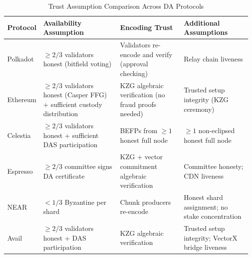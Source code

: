\begin{table}[t]
\centering
\caption{Trust Assumption Comparison Across DA Protocols}
\label{tab:trust_summary}
\setlength{\tabcolsep}{4pt}
\renewcommand{\arraystretch}{1.2}
\footnotesize
\begin{tabular}{p{1.4cm}p{4.9cm}p{4.9cm}p{4.9cm}}
\toprule
\textbf{Protocol} & \textbf{Availability Assumption} & \textbf{Encoding Trust} & \textbf{Additional Assumptions} \\
\midrule
Polkadot & $\geq 2/3$ validators honest (bitfield voting) & Validators re-encode and verify (approval checking) & Relay chain liveness \\
Ethereum & $\geq 2/3$ validators honest (Casper FFG) + sufficient custody distribution & KZG algebraic verification (no fraud proofs needed) & Trusted setup integrity (KZG ceremony) \\
Celestia & $\geq 2/3$ validators honest + sufficient DAS participation & BEFPs from $\geq 1$ honest full node & $\geq 1$ non-eclipsed honest full node \\
Espresso & $\geq 2/3$ committee signs DA certificate & KZG + vector commitment algebraic verification & Committee honesty; CDN liveness \\
NEAR & $< 1/3$ Byzantine per shard & Chunk producers re-encode & Honest shard assignment; no stake concentration \\
Avail & $\geq 2/3$ validators honest + DAS participation & KZG algebraic verification & Trusted setup integrity; VectorX bridge liveness \\
\bottomrule
\end{tabular}
\end{table}
